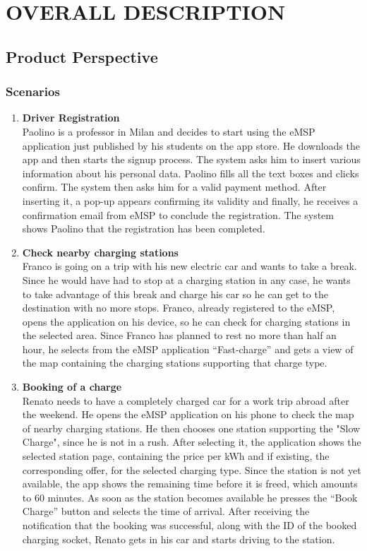 \chapter{OVERALL DESCRIPTION}
\label{ch:overallDescription}%

\section{Product Perspective}
\label{sec:productPerspective}

\subsection{Scenarios} %
\label{subsec:scenarios}
\begin{enumerate}
\item \textbf{Driver Registration}\\
Paolino is a professor in Milan and decides to start using the eMSP application just published by his students on the app store.
He downloads the app and then starts the signup process. The system asks him to insert various information about his personal data. Paolino fills all the text boxes and clicks confirm. The system then asks him for a valid payment method. After inserting it, a pop-up appears confirming its validity and finally, he receives a confirmation email from eMSP to conclude the registration. The system shows Paolino that the registration has been completed.
\item \textbf{Check nearby charging stations}\\
Franco is going on a trip with his new electric car and wants to take a break. Since he would have had to stop at a charging station in any case, he wants to take advantage of this break and charge his car so he can get to the destination with no more stops.
Franco, already registered to the eMSP, opens the application on his device, so he can check for charging stations in the selected area. 
Since Franco has planned to rest no more than half an hour, he selects from the eMSP application “Fast-charge” and gets a view of the map containing the charging stations supporting that charge type.
\item \textbf{Booking of a charge}\\
Renato needs to have a completely charged car for a work trip abroad after the weekend. He opens the eMSP application on his phone to check the map of nearby charging stations. He then chooses one station supporting the "Slow Charge", since he is not in a rush. After selecting it, the application shows the selected station page, containing the price per kWh and if existing, the corresponding offer, for the selected charging type. Since the station is not yet available, the app shows the remaining time before it is freed, which amounts to 60 minutes. As soon as the station becomes available he presses the “Book Charge” button and selects the time of arrival. After receiving the notification that the booking was successful, along with the ID of the booked charging socket, Renato gets in his car and starts driving to the station.

\end{enumerate}
